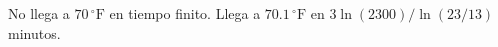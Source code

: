 No llega a $70\,{}^\circ\mathrm F$ en tiempo finito. Llega a $70.1\,{}^\circ\mathrm F$ en $3\ln(2300)/\ln(23/13)$ minutos.
